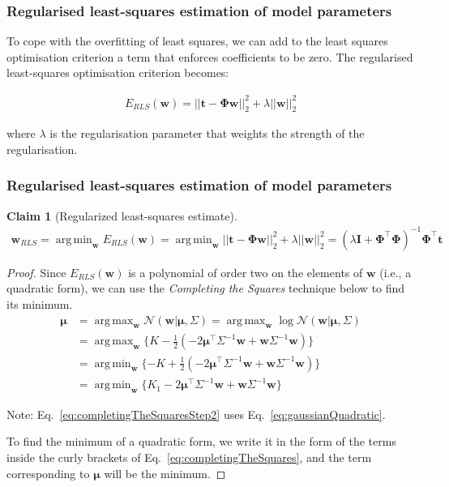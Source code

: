 \documentclass[11pt]{beamer}
\newtheorem{claim}{Claim}
\DeclareMathOperator*{\argmax}{arg\,max}
\DeclareMathOperator*{\argmin}{arg\,min}
\begin{document}
\begin{frame}
    \frametitle{Regularised least-squares estimation of model parameters}

    To cope with the overfitting of least squares, we can add to the least
    squares optimisation criterion a term that enforces coefficients to be
    zero. The regularised least-squares optimisation criterion becomes:

    \begin{align*}
        E_{RLS}(\mathbf{w})=||\mathbf{t}-\boldsymbol{\Phi}\mathbf{w}||_2^2+\lambda||\mathbf{w}||_2^2
    \end{align*}

    where $\lambda$ is the regularisation parameter that weights the strength
    of the regularisation.
\end{frame}

\begin{frame}
    \frametitle{Regularised least-squares estimation of model parameters}
	\scriptsize
	\begin{claim}[Regularized least-squares estimate]
		\begin{align*}
			\mathbf{w}_{RLS}=\argmin_{\mathbf{w}}E_{RLS}(\mathbf{w})=\argmin_{\mathbf{w}}||\mathbf{t}-\boldsymbol{\Phi}\mathbf{w}||_2^2+\lambda||\mathbf{w}||_2^2=(\lambda\mathbf{I}+\boldsymbol{\Phi}^\intercal\boldsymbol{\Phi})^{-1}\boldsymbol{\Phi}^\intercal\mathbf{t}
		\end{align*}
	\end{claim}
	\tiny
	\begin{proof}
		Since $E_{RLS}(\mathbf{w})$ is a polynomial of order two on the elements of $\mathbf{w}$ (i.e., a quadratic form), we can use the \emph{Completing the Squares} technique below to find its minimum.
		\begin{align}
			\boldsymbol{\mu}&=\argmax_{\mathbf{w}}\mathcal{N}(\mathbf{w}|\boldsymbol{\mu},\Sigma)=\argmax_{\mathbf{w}}\log\mathcal{N}(\mathbf{w}|\boldsymbol{\mu},\Sigma)\nonumber\\
                            &=\argmax_{\mathbf{w}}\{K-\frac{1}{2}(-2\boldsymbol{\mu}^\intercal\Sigma^{-1}\mathbf{w}+\mathbf{w}\Sigma^{-1}\mathbf{w})\}\label{eq:completingTheSquaresStep2}\\
                            &=\argmin_{\mathbf{w}}\{-K+\frac{1}{2}(-2\boldsymbol{\mu}^\intercal\Sigma^{-1}\mathbf{w}+\mathbf{w}\Sigma^{-1}\mathbf{w})\}\nonumber\\
                            &=\argmin_{\mathbf{w}}\{K_1-2\boldsymbol{\mu}^\intercal\Sigma^{-1}\mathbf{w}+\mathbf{w}\Sigma^{-1}\mathbf{w}\}\label{eq:completingTheSquares}
		\end{align}

		Note: Eq.~\ref{eq:completingTheSquaresStep2} uses Eq.~\ref{eq:gaussianQuadratic}.

		To find the minimum of a quadratic form, we write it in the form of the
terms inside the curly brackets of Eq.~\ref{eq:completingTheSquares}, and the
term corresponding to $\boldsymbol{\mu}$ will be the minimum.

		\phantom\qedhere
	\end{proof}
	\normalsize
\end{frame}
\end{document}
